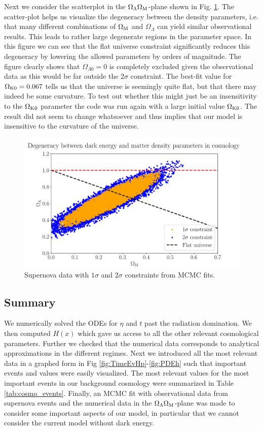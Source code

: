 \documentclass[%
reprint,
 amsmath,amssymb,
 aps,
]{revtex4-2}
\begin{document}
Next we consider the scatterplot in the $\Omega_\Lambda\Omega_\text M$-plane shown in Fig. \ref{fig:scatt}. The scatter-plot helps us visualize the degeneracy between the density parameters, i.e. that many different combinations of $\Omega_\text M$ and $\Omega_{\Lambda}$ can yield similar observational results. This leads to rather large degenerate regions in the parameter space. In this figure we can see that the flat universe constraint significantly reduces this degeneracy by lowering the allowed parameters by orders of magnitude. The figure clearly shows that $\Omega_{\Lambda0}=0$ is completely excluded given the observational data as this would be far outside the $2\sigma$ constraint. The best-fit value for $\Omega_{\text K0}=0.067$ tells us that the universe is seemingly quite flat, but that there may indeed be some curvature. To test out whether this might just be an insensitivity to the $\Omega_{\text K0}$ parameter the code was run again with a large initial value $\Omega_{\text K0}$. The result did not seem to change whatsoever and thus implies that our model is insensitive to the curvature of the universe.
\begin{figure}[ht!]
\includegraphics[width = \linewidth]{Figures/ScattPlot.pdf}
\caption{Supernova data with $1\sigma$ and $2\sigma$ constraints from MCMC fits.}
\label{fig:scatt}
\end{figure}

\subsection{Summary}
We numerically solved the ODEs for $\eta$ and $t$ past the radiation domination. We then computed $H(x)$ which gave us access to all the other relevant cosmological parameters. Further we checked that the numerical data corresponds to analytical approximations in the different regimes. Next we introduced all the most relevant data in a graphed form in Fig \ref{fig:TimeEvHp}-\ref{fig:PDEh} such that important events and values were easily visualized. The most relevant values for the most important events in our background cosmology were summarized in Table \ref{tab:cosmo_events}. Finally, an MCMC fit with observational data from supernova events and the numerical data in the $\Omega_{\Lambda}\Omega_{\text M}$-plane was made to consider some important aspects of our model, in particular that we cannot consider the current model without dark energy. 
\end{document}
